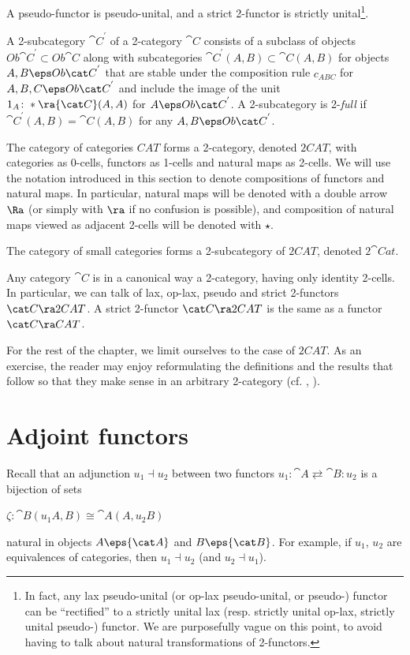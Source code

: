 A pseudo-functor is pseudo-unital, and a strict 2-functor is strictly unital\footnote{In fact, any lax pseudo-unital (or op-lax pseudo-unital, or pseudo-) functor can be ``rectified'' to a strictly unital lax (resp. strictly unital op-lax, strictly unital pseudo-) functor. We are purposefully vague on this point, to avoid having to talk about natural transformations of 2-functors.}.

A 2-subcategory ${\cat C}^{'}$ of a 2-category ${\cat C}$ consists of a subclass of objects $Ob {\cat C}^{'} \subset Ob{\cat C}$ along with subcategories ${\cat C}^{'}(A, B) \subset {\cat C}(A, B)$ for objects $A, B \eps Ob {\cat C}^{'}$ that are stable under the composition rule $c_{ABC}$ for $A, B, C \eps Ob{\cat C}^{'}$ and include the image of the unit $1_A \colon * \ra {\cat C}(A, A)$ for $A \eps Ob{\cat C}^{'}$. A 2-subcategory is 2-{\it full} if ${\cat C}^{'}(A, B) = {\cat C}(A, B)$ for any $A, B \eps Ob {\cat C}^{'}$.

The category of categories $CAT$ forms a 2-category, denoted $2CAT$, with categories as 0-cells, functors as 1-cells and natural maps as 2-cells. We will use the notation introduced in this section to denote compositions of functors and natural maps. In particular, natural maps will be denoted with a double arrow $\Ra$ (or simply with $\ra$ if no confusion is possible), and composition of natural maps viewed as adjacent 2-cells will be denoted with $\star$. 

The category of small categories forms a 2-subcategory of $2CAT$, denoted $2{\cat Cat}$.

Any category ${\cat C}$ is in a canonical way a 2-category, having only identity 2-cells. In particular, we can talk of lax, op-lax, pseudo and strict 2-functors ${\cat C} \ra 2CAT$. A strict 2-functor ${\cat C} \ra 2CAT$ is the same as a functor ${\cat C} \ra CAT$.

For the rest of the chapter, we limit ourselves to the case of $2CAT$. As an exercise, the reader may enjoy reformulating the definitions and the results that follow so that they make sense in an arbitrary 2-category (cf. \cite{Kelly-Street1}, \cite{Street1}).

\section{Adjoint functors}
\label{sec:adjointfunctors}
Recall that an adjunction $u_1 \dashv u_2$ between two functors $u_1 : {\cat A} \rightleftarrows {\cat B} : u_2$ is a bijection of sets
\begin{center}
$\zeta \colon {\cat B}(u_1A, B) \cong {\cat A}(A, u_2B)$ 
\end{center}
natural in objects $A \eps {\cat A}$ and $B \eps {\cat B}$. For example, if $u_1$, $u_2$ are equivalences of categories, then $u_1 \dashv u_2$ (and $u_2 \dashv u_1$).

